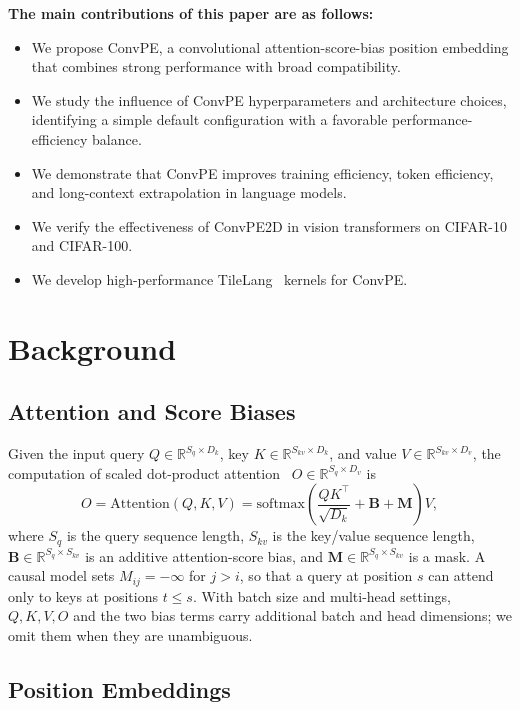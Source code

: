 \documentclass{article}
\begin{document}
\textbf{The main contributions of this paper are as follows:}
\begin{itemize}
    \item We propose ConvPE, a convolutional attention-score-bias position embedding that combines strong performance with broad compatibility.
    \item We study the influence of ConvPE hyperparameters and architecture choices, identifying a simple default configuration with a favorable performance-efficiency balance.
    \item We demonstrate that ConvPE improves training efficiency, token efficiency, and long-context extrapolation in language models.
    \item We verify the effectiveness of ConvPE2D in vision transformers on CIFAR-10 and CIFAR-100.
    \item We develop high-performance TileLang~\cite{DBLP:journals/corr/abs-2504-17577} kernels for ConvPE.
\end{itemize}


\section{Background}

\subsection{Attention and Score Biases}

Given the input query $Q \in \mathbb{R}^{S_q \times D_k}$, key $K \in \mathbb{R}^{S_{kv} \times D_k}$, and value $V \in \mathbb{R}^{S_{kv} \times D_v}$, the computation of scaled dot-product attention~\cite{vaswani2017attention} $O\in \mathbb{R}^{S_q \times D_v}$ is
\begin{equation}
O = \mathrm{Attention}(Q,K,V) = \mathrm{softmax}\left(\frac{QK^\top}{\sqrt{D_k}} + \mathbf{B} + \mathbf{M}\right)V,
\end{equation}
where $S_q$ is the query sequence length, $S_{kv}$ is the key/value sequence length, $\mathbf{B}\in\mathbb{R}^{S_q\times S_{kv}}$ is an additive attention-score bias, and $\mathbf{M}\in\mathbb{R}^{S_q\times S_{kv}}$ is a mask. A causal model sets $M_{ij}=-\infty$ for $j>i$, so that a query at position $s$ can attend only to keys at positions $t\le s$. With batch size and multi-head settings, $Q,K,V,O$ and the two bias terms carry additional batch and head dimensions; we omit them when they are unambiguous.

\subsection{Position Embeddings}
\end{document}
